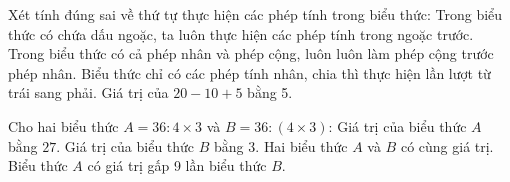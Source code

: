 \begin{ex} %
Xét tính đúng sai về thứ tự thực hiện các phép tính trong biểu thức:
\choiceTF
{\True Trong biểu thức có chứa dấu ngoặc, ta luôn thực hiện các phép tính trong ngoặc trước.}
{Trong biểu thức có cả phép nhân và phép cộng, luôn luôn làm phép cộng trước phép nhân.}
{\True Biểu thức chỉ có các phép tính nhân, chia thì thực hiện lần lượt từ trái sang phải.}
{Giá trị của $20 - 10 + 5$ bằng 5.}
\end{ex}

\begin{ex} %
Cho hai biểu thức $A = 36 : 4 \times 3$ và $B = 36 : (4 \times 3)$:
\choiceTF
{\True Giá trị của biểu thức $A$ bằng $27$.}
{\True Giá trị của biểu thức $B$ bằng $3$.}
{Hai biểu thức $A$ và $B$ có cùng giá trị.}
{\True Biểu thức $A$ có giá trị gấp 9 lần biểu thức $B$.}
\end{ex}

